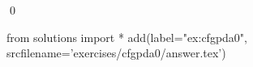 
\begin{ex} 
  \label{ex:cfgpda0}
  
  \qed
\end{ex} 
\begin{python0}
from solutions import *
add(label="ex:cfgpda0",
    srcfilename='exercises/cfgpda0/answer.tex') 
\end{python0}
